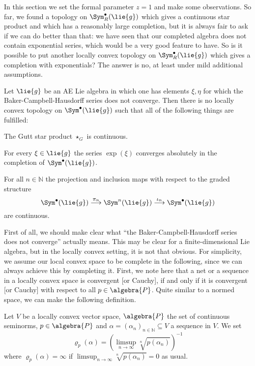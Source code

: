 In this section we set the formal parameter $z = 1$ and make some 
observations. So far, we found a topology on $\Sym_R^{\bullet}(\lie{g})$ which 
gives a continuous star product and which has a reasonably large completion, 
but it is always fair to ask if we can do better than that: we have seen that 
our completed algebra does not contain exponential series, which would be a 
very good feature to have. So is it possible to put another locally convex 
topology on $\Sym_R^{\bullet}(\lie{g})$ which gives a completion with 
exponentials? The answer is no, at least under mild additional assumptions. 
\begin{proposition}
	\label{LCAna:Prop:NoBetterTopology}
	Let $\lie{g}$ be an AE Lie algebra in which one has elements $\xi, \eta$ 
	for which the Baker-Campbell-Hausdorff series does not converge. 
	Then there is no locally convex topology on $\Sym^{\bullet}(\lie{g})$ 
	such that all of the following things are fulfilled:
	\begin{propositionlist}
		\item
		The Gutt star product $\star_G$ is continuous.
		\item
		For every $\xi \in \lie{g}$ the series $\exp(\xi)$ converges 
		absolutely in the completion of $\Sym^{\bullet}(\lie{g})$.
		\item
		For all $n \in \mathbb{N}$ the projection and inclusion maps with 
		respect to the graded structure
		\begin{equation*}
			\Sym^{\bullet}(\lie{g})
	    		\ot{$\pi_n$}{\longrightarrow}
    	    		\Sym^n(\lie{g})
	    	    	\ot{$\iota_n$}{\longrightarrow}
	    		\Sym^{\bullet}(\lie{g})
		\end{equation*}
		are continuous.
	\end{propositionlist}
\end{proposition}
First of all, we should make clear what ``the Baker-Campbell-Hausdorff series 
does not converge'' actually means. This may be clear for a finite-dimensional 
Lie algebra, but in the locally convex setting, it is not that obvious. For 
simplicity, we assume our local convex space to be complete in the 
following, since we can always achieve this by completing it. First, we note 
here that a net or a sequence in a locally convex space is  convergent [or 
Cauchy], if and only if it is convergent [or Cauchy] with respect 
to all $p \in \algebra{P}$. Quite similar to a normed space, we can make the 
following definition.
\begin{definition}
	\label{Def:RadiusOfConvergenceLCS}
	Let $V$ be a locally convex vector space, $\algebra{P}$ the set of 
	continuous seminorms, $p \in \algebra{P}$ and 
	$\alpha = (\alpha_n)_{n \in \mathbb{N}}\subseteq V$ a sequence in $V$. 
	We set
	\begin{equation*}
		\varrho_p(\alpha)
		=
		\left(
			\limsup_{n \longrightarrow \infty}
			\sqrt[n]{p \left(\alpha_n \right)}
		\right)^{-1}
	\end{equation*}
	where $\varrho_p(\alpha) = \infty$ if $\limsup_{n \longrightarrow \infty} 
	\sqrt[n]{p \left(\alpha_n \right)} = 0$ as usual.
\end{definition}
